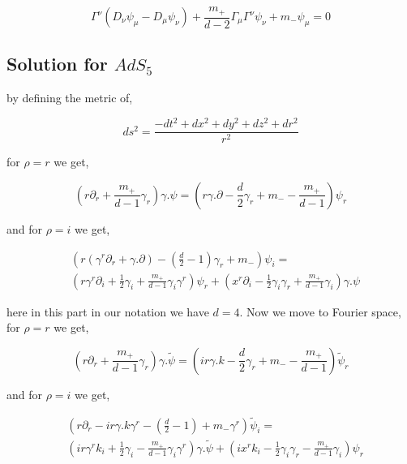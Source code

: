 \begin{equation}
   \Gamma^{\nu}(D_{\nu}\psi_{\mu} - D_{\mu}\psi_{\nu}) + \frac{m_{+}}{d-2}\Gamma_{\mu}\Gamma^{\nu}\psi_{\nu} + m_{-}\psi_{\mu} = 0
\end{equation}


\subsection{Solution for $AdS_5$}

by defining the metric of,

\begin{equation}
   ds^2 = \frac{-dt^2 + dx^2 + dy^2 + dz^2 + dr^2}{r^2}
\end{equation}

for $\rho = r$ we get,

\begin{equation}
   \left(r \partial_r + \frac{m_+}{d-1}\gamma_r\right) \gamma.\psi = \left( r \gamma.\partial - \frac{d}{2} \gamma_r + m_- - \frac{m_+}{d-1}\right) \psi_r
\end{equation}

and for $\rho = i$ we get,

\begin{align}
   & \left( r \left(\gamma^r \partial_r + \gamma.\partial \right) - \left(\frac{d}{2}-1\right)\gamma_r + m_- \right) \psi_i = \\
   & \left( r \gamma^r \partial_i + \frac{1}{2}\gamma_i + \frac{m_+}{d-1}\gamma_i\gamma^r \right) \psi_r + \left(x^r \partial_i - \frac{1}{2}\gamma_i\gamma_r + \frac{m_+}{d-1}\gamma_i\right) \gamma.\psi \nonumber
\end{align}

here in this part in our notation we have $d=4$. Now we move to Fourier space, for $\rho = r$ we get,

\begin{equation} \label{eq:AdS5gravitinisolution1}
   \left(r \partial_r + \frac{m_+}{d-1}\gamma_r\right) \gamma.\tilde{\psi} = \left( i r \gamma.k - \frac{d}{2} \gamma_r + m_- - \frac{m_+}{d-1}\right) \tilde{\psi}_r
\end{equation}

and for $\rho = i$ we get,

\begin{align} \label{eq:AdS5gravitinisolution2}
   & \left( r\partial_r -ir\gamma.k\gamma^r - \left(\frac{d}{2}-1\right) + m_-\gamma^r \right) \tilde{\psi}_i = \\
   & \left( ir \gamma^r k_i + \frac{1}{2}\gamma_i - \frac{m_+}{d-1}\gamma_i\gamma^r \right) \gamma.\tilde{\psi} + \left(ix^r k_i - \frac{1}{2}\gamma_i\gamma_r - \frac{m_+}{d-1}\gamma_i\right) \psi_r \nonumber
\end{align}

